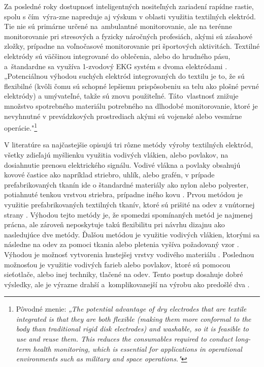Za posledné roky dostupnosť inteligentných nositeľných zariadení rapídne rastie, spolu s čím~výra-zne napreduje aj výskum v oblasti využitia textilných elektród. Tie nie sú primárne určené na~ambulantné monitorovanie, ale na terénne monitorovanie pri stresových a fyzicky náročných profesiách, akými sú zásahové zložky, prípadne na voľnočasové monitorovanie pri športových aktivitách. Textilné elektródy sú väčšinou integrované do oblečenia, alebo do hrudného pásu, a~štandardne sa využíva 1-zvodový EKG systém s dvoma elektródami \cite{Thakor1980}. „Potenciálnou výhodou suchých elektród integrovaných do textilu je to, že sú flexibilné (kvôli čomu sú schopné lepšiemu prispôsobeniu sa telu ako plošné pevné elektródy) a umývateľné, takže sú znovu použiteľné. Táto~vlastnosť znižuje množstvo spotrebného materiálu potrebného na dlhodobé monitorovanie, ktoré je nevyhnutné v prevádzkových prostrediach akými sú vojenské alebo vesmírne operácie."\footnote{Pôvodné znenie: \textit{„The potential advantage of dry electrodes that are textile integrated is that they are both flexible (making them more conformal to the body than traditional rigid disk electrodes) and washable, so it is feasible to use and reuse them. This reduces the consumables required to conduct long-term health monitoring, which is essential for applications in operational environments such as military and space operations."}}~\cite{Arquilla2020}

V literatúre sa najčastejšie opisujú tri rôzne metódy výroby textilných elektród, všetky zdieľajú myšlienku využitia vodivých vlákien, alebo povlakov, na dosiahnutie prenosu elektrického signálu. Vodivé vlákna a povlaky obsahujú kovové častice ako napríklad striebro, uhlík, alebo grafén, v prípade prefabrikovaných tkanín ide o štandardné materiály ako nylon alebo polyester, potiahnuté tenkou vrstvou striebra, prípadne iného kovu \cite{Pani2018}. Prvou metódou je využitie prefabrikovaných textilných tkanív, ktoré sú prišité na odev z vnútornej strany \cite{Vojtech2013}. Výhodou tejto metódy je, že spomedzi spomínaných metód je najmenej prácna, ale zároveň neposkytuje takú flexibilitu pri návrhu dizajnu ako nasledujúce dve metódy. Ďalšou metódou je využitie vodivých vlákien, ktorými sa následne na odev za pomoci tkania alebo pletenia vyšíva požadovaný vzor \cite{Marozas2011}\cite{Fobelets2023}. Výhodou je možnosť vytvorenia hustejšej vrstvy vodivého materiálu \cite{Arquilla2020}. Poslednou možnosťou je využitie vodivých farieb alebo povlakov, ktoré sú pomocou sieťotlače, alebo inej techniky, tlačené na odev. Tento postup dosahuje dobré výsledky, ale je výrazne drahší a~komplikovanejší na výrobu ako predošlé dva \cite{Xu2020}\cite{Paul2015}.

